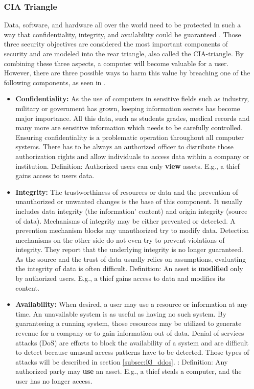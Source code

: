 \subsubsection{CIA Triangle}
Data, software, and hardware all over the world need to be protected in such a way that confidentiality, integrity, and availability could be guaranteed \cite{Pfleeger2014}. Those three security objectives are considered the most important components of security and are modeled into the rear triangle, also called the CIA-triangle. By combining these three aspects, a computer will become valuable for a user. However, there are three possible ways to harm this value by breaching one of the following components, as seen in \cite{Bishop2004}.
\begin{itemize}
    \item \textbf{Confidentiality:} As the use of computers in sensitive fields such as industry, military or government has grown, keeping information secrets has become major importance. All this data, such as students grades, medical records and many more are sensitive information which needs to be carefully controlled. Ensuring confidentiality is a problematic operation throughout all computer systems. There has to be always an authorized officer to distribute those authorization rights and allow individuals to access data within a company or institution.
      \subitem Definition: Authorized users can only \textbf{view} assets. E.g., a thief gains access to users data.
    \item \textbf{Integrity:} The trustworthiness of resources or data and the prevention of unauthorized or unwanted changes is the base of this component. It usually includes data integrity (the information' content) and origin integrity (source of data). Mechanisms of integrity may be either prevented or detected. A prevention mechanism blocks any unauthorized try to modify data. Detection mechanisms on the other side do not even try to prevent violations of integrity. They report that the underlying integrity is no longer guaranteed. As the source and the trust of data usually relies on assumptions, evaluating the integrity of data is often difficult.
        \subitem Definition: An asset is \textbf{modified} only by authorized users. E.g., a thief gains access to data and modifies its content.
    \item \textbf{Availability:} When desired, a user may use a resource or information at any time. An unavailable system is as useful as having no such system. By guaranteeing a running system, those resources may be utilized to generate revenue for a company or to gain information out of data. Denial of services attacks (DoS) are efforts to block the availability of a system and are difficult to detect because unusual access patterns have to be detected. Those types of attacks will be described in section \ref{subsec:03_ddos}.
      \subitem:  Definition: Any authorized party may \textbf{use} an asset. E.g., a thief steals a computer, and the user has no longer access.
\end{itemize}

